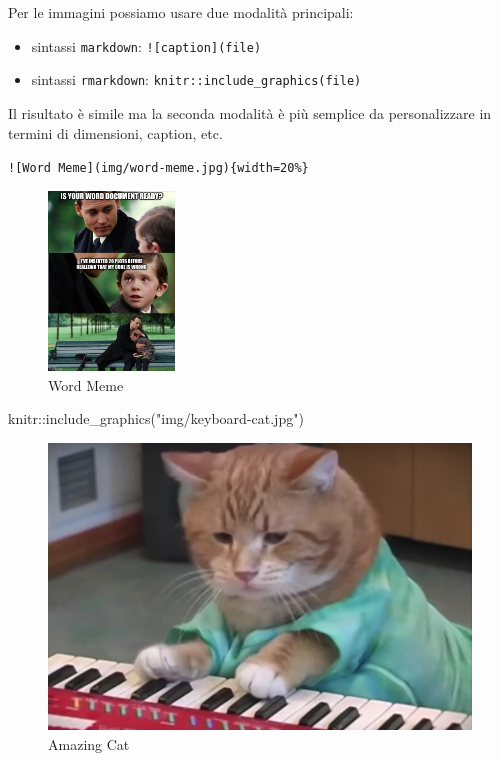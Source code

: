 \documentclass[
]{article}
\newenvironment{Shaded}{\begin{snugshade}}{\end{snugshade}}
\newcommand{\FunctionTok}[1]{\textcolor[rgb]{0.00,0.00,0.00}{#1}}
\newcommand{\NormalTok}[1]{#1}
\newcommand{\SpecialCharTok}[1]{\textcolor[rgb]{0.00,0.00,0.00}{#1}}
\newcommand{\StringTok}[1]{\textcolor[rgb]{0.31,0.60,0.02}{#1}}
\providecommand{\tightlist}{%
  \setlength{\itemsep}{0pt}\setlength{\parskip}{0pt}}
\begin{document}
Per le immagini possiamo usare due modalità principali:

\begin{itemize}
\tightlist
\item
  sintassi \texttt{markdown}: \texttt{!{[}caption{]}(file)}
\item
  sintassi \texttt{rmarkdown}: \texttt{knitr::include\_graphics(file)}
\end{itemize}

Il risultato è simile ma la seconda modalità è più semplice da personalizzare in termini di dimensioni, caption, etc.

\texttt{!{[}Word\ Meme{]}(img/word-meme.jpg)\{width=20\%\}}

\begin{figure}
\centering
\includegraphics[width=0.3\textwidth,height=\textheight]{img/word-meme.jpg}
\caption{Word Meme}
\end{figure}

\begin{Shaded}
\begin{Highlighting}[]
\NormalTok{knitr}\SpecialCharTok{::}\FunctionTok{include\_graphics}\NormalTok{(}\StringTok{"img/keyboard{-}cat.jpg"}\NormalTok{)}
\end{Highlighting}
\end{Shaded}

\begin{figure}

{\centering \includegraphics[width=0.3\linewidth]{img/keyboard-cat} 

}

\caption{Amazing Cat}\label{fig:keycat}
\end{figure}
\end{document}
